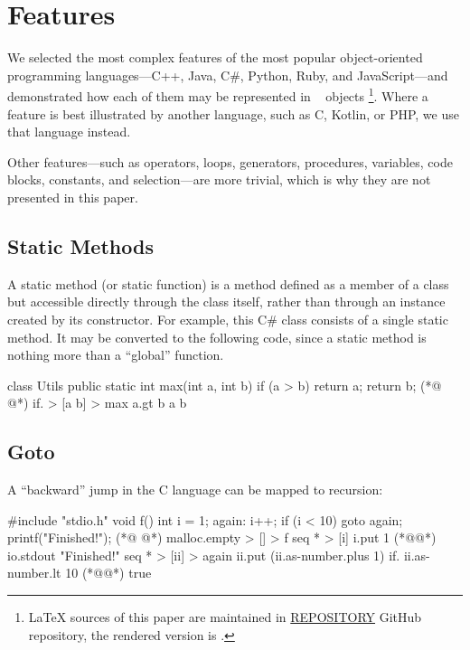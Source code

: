 
\section{Features}

We selected the most complex features of the most popular
  object-oriented programming languages---C++, Java, C\#, Python, Ruby,
  and JavaScript---and demonstrated how each of them may be represented
  in \eolang{}~\citep{bugayenko2021eolang} objects%
    \footnote{%
    \LaTeX{} sources of this paper are maintained in
    \href{https://github.com/REPOSITORY}{REPOSITORY} GitHub repository,
  the rendered version is
    \href{https://github.com/REPOSITORY/releases/tag/0.0.0}{}.}.
Where a feature is best illustrated by another language, such as C,
  Kotlin, or PHP, we use that language instead.

Other features---such as operators, loops, generators, procedures,
  variables, code blocks, constants, and selection---are more trivial,
  which is why they are not presented in this paper.

\subsection{Static Methods}
\label{sec:static}

A static method (or static function) is a method defined as a member
  of a class but accessible directly through the class itself,
  rather than through an instance created by its constructor.
For example, this C\# class consists of a single static method.
It may be converted to the following \eolang{} code,
  since a static method is nothing more than a ``global'' function.

\begin{ffcode}
class Utils {
  public static int max(int a, int b) {
    if (a > b) return a;
    return b;
  }
}
(*@ \ffcolumnbreak @*)
if. > [a b] > max
  a.gt b
  a
  b
\end{ffcode}

\subsection{Goto}
\label{sec:goto}

A ``backward'' jump in the C language can be mapped to \eolang{} recursion:

\begin{ffcode}
#include "stdio.h"
void f() {
  int i = 1;
  again:
  i++;
  if (i < 10)
    goto again;
  printf("Finished!");
}
(*@ \ffcolumnbreak @*)
malloc.empty > [] > f
  seq * > [i]
    i.put 1
    (*@@*)
    io.stdout "Finished!"
  seq * > [ii] > again
    ii.put (ii.as-number.plus 1)
    if.
      ii.as-number.lt 10
      (*@@*)
      true
\end{ffcode}

